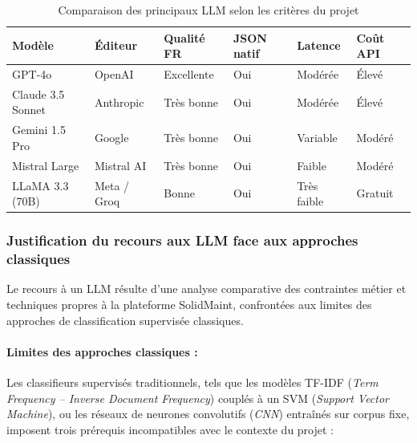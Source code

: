\begin{table}[H]
\centering
\renewcommand{\arraystretch}{1.2}
\small
\begin{tabular}{|P{2.8cm}|P{2.3cm}|P{2.0cm}|P{2.0cm}|P{2.0cm}|P{2.0cm}|}
\hline
\textbf{Modèle} & \textbf{Éditeur} & \textbf{Qualité FR} &
\textbf{JSON natif} & \textbf{Latence} & \textbf{Coût API} \\
\hline
GPT-4o            & OpenAI      & Excellente & Oui & Modérée     & Élevé  \\
\hline
Claude 3.5 Sonnet & Anthropic   & Très bonne & Oui & Modérée     & Élevé  \\
\hline
Gemini 1.5 Pro    & Google      & Très bonne & Oui & Variable    & Modéré \\
\hline
Mistral Large     & Mistral AI  & Très bonne & Oui & Faible      & Modéré \\
\hline
LLaMA 3.3 (70B)   & Meta / Groq & Bonne      & Oui & Très faible & Gratuit\\
\hline
\end{tabular}
\caption{Comparaison des principaux LLM selon les critères du projet}
\label{tab:comparaison_llm}
\end{table}

\subsubsection{Justification du recours aux LLM face aux approches
classiques}

Le recours à un LLM résulte d'une analyse comparative des contraintes
métier et techniques propres à la plateforme SolidMaint, confrontées
aux limites des approches de classification supervisée classiques.

\paragraph{Limites des approches classiques :}

Les classifieurs supervisés traditionnels, tels que les modèles
TF-IDF (\textit{Term Frequency – Inverse Document Frequency})
couplés à un SVM (\textit{Support Vector Machine}), ou les réseaux
de neurones convolutifs (\textit{CNN}) entraînés sur corpus fixe,
imposent trois prérequis incompatibles avec le contexte du projet :

